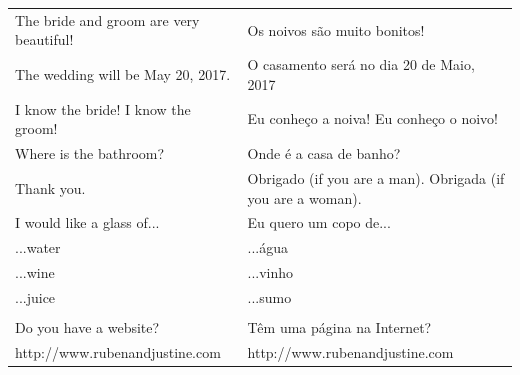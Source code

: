 \documentclass[10pt]{article}
\begin{document}
\pagestyle{empty}


\begin{tabular}{p{1.5in}|p{1.5in}}
  The bride and groom are very beautiful!
  &
  Os noivos são muito bonitos!
  \vspace{0.1in}
  \\
  The wedding will be May 20, 2017.
  &
  O casamento será no dia 20 de Maio, 2017
  \vspace{0.1in}
  \\
  I know the bride! I know the groom! 
  &
  Eu conheço a noiva! Eu conheço o noivo!
  \vspace{0.1in}
  \\
  Where is the bathroom?
  &
  Onde é a casa de banho?
  \vspace{0.1in}
  \\
  Thank you.
  &
  Obrigado (if you are a man). Obrigada (if you are a woman).
  \vspace{0.1in}
  \\
  I would like a glass of...
  &
  Eu quero um copo de...
  \vspace{0.1in}
  \\
  \hspace{0.1in}...water & \hspace{0.1in}...água\\
  \hspace{0.1in}...wine & \hspace{0.1in}...vinho\\
  \hspace{0.1in}...juice & \hspace{0.1in}...sumo\\
  \vspace{0.1in}
  \\
  Do you have a website? & Têm uma página na Internet?\\
  {\scriptsize http://www.rubenandjustine.com} & {\scriptsize http://www.rubenandjustine.com}\\
\end{tabular}
\vspace{1in}
\end{document}
